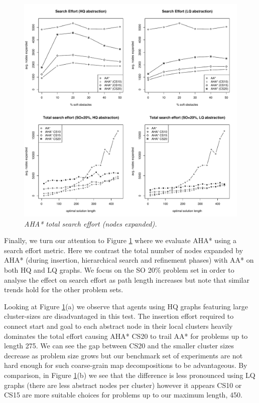 \begin{figure}[htbp]
	\vspace{-12pt}
	\caption{\small{\emph{AHA* total search effort (nodes expanded).}}}
	\begin{center}
		       \includegraphics[scale=0.35, trim = 20mm 17mm 20mm 5mm]{diagrams/searcheffort.pdf}
	\end{center}
	\label{aha-fig:searcheffort}
	\vspace{-5pt}
\end{figure}
%
\par \indent
Finally, we turn our attention to Figure \ref{aha-fig:searcheffort} where we evaluate AHA* using a search effort metric.
Here we contrast the total number of nodes expanded by AHA* (during insertion, hierarchical search and refinement phases) with AA* on both HQ and LQ graphs.
We focus on the SO 20\% problem set in order to analyse the effect on search effort as path length increases but note that similar trends hold for the other problem sets.
\par \indent
Looking at Figure \ref{aha-fig:searcheffort}(a) we observe that agents using HQ graphs featuring large cluster-sizes are disadvantaged in this test. 
The insertion effort required to connect start and goal to each abstract node in their local clusters heavily dominates the total effort causing AHA* CS20 to trail AA* for problems up to length 275.
We can see the gap between CS20 and the smaller cluster sizes decrease as problem size grows but our benchmark set of experiments are not hard enough for such coarse-grain map decompositions to be advantageous. 
By comparison, in Figure \ref{aha-fig:searcheffort}(b) we see that the difference is less pronounced using LQ graphs (there are less abstract nodes per cluster) however it appears CS10 or CS15 are more suitable choices for problems up to our maximum length, 450.
